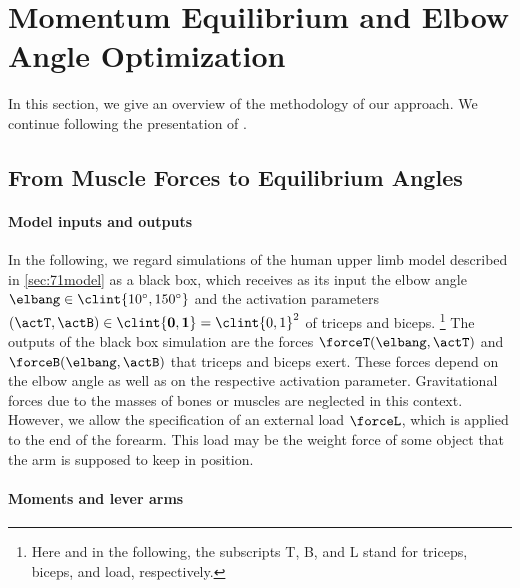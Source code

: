 \section{Momentum Equilibrium and Elbow Angle Optimization}
\label{sec:72methodology}


\noindent
In this section, we give an overview of the methodology of our approach.
We continue following the presentation of \cite{Valentin18Gradient}.



\subsection{From Muscle Forces to Equilibrium Angles}
\label{sec:721equilibrium}

\paragraph{Model inputs and outputs}

In the following, we regard simulations of the
human upper limb model described in \cref{sec:71model} as a black box,
which receives as its input
the elbow angle $\elbang \in \clint{\ang{10}, \ang{150}}$
and the activation parameters
$(\actT, \actB) \in \clint{\*0, \*1} = \clint{0, 1}^2$
of triceps and biceps.%
\footnote{%
  Here and in the following, the subscripts T, B, and L stand for
  triceps, biceps, and load, respectively.%
}
The outputs of the black box simulation are the forces
$\forceT(\elbang, \actT)$ and $\forceB(\elbang, \actB)$
that triceps and biceps exert.
These forces depend on the elbow angle as well as on the respective
activation parameter.
Gravitational forces due to the masses of bones or muscles
are neglected in this context.
However, we allow the specification of an external load $\forceL$,
which is applied to the end of the forearm.
This load may be the weight force of some object
that the arm is supposed to keep in position.

\paragraph{Moments and lever arms}

